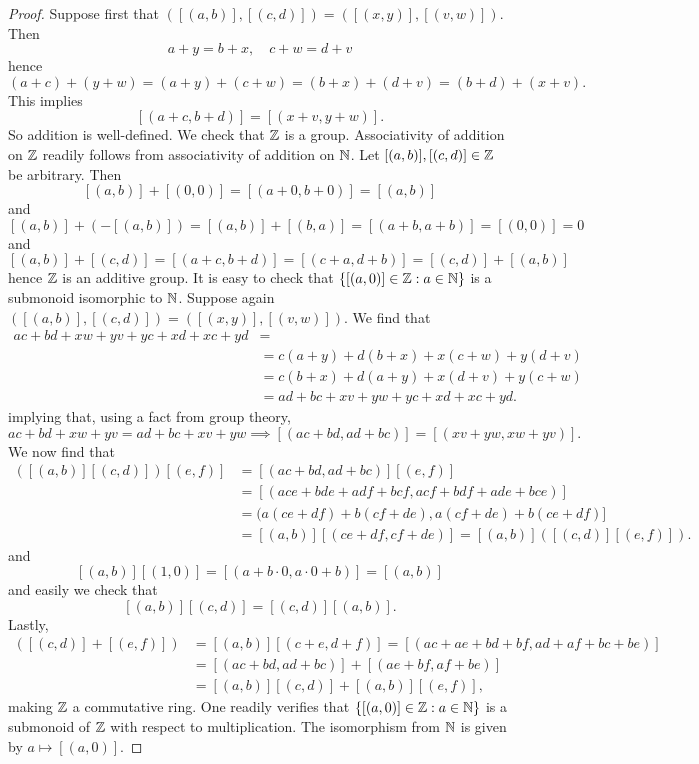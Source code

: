     \begin{proof}
        Suppose first that $([(a,b)],[(c,d)])=([(x,y)],[(v,w)])$. Then 
        $$
            a+y=b+x,\quad c+w=d+v
        $$
        hence
        $$
            (a+c)+(y+w)=(a+y)+(c+w)=(b+x)+(d+v)=(b+d)+(x+v).
        $$
        This implies 
        $$
            [(a+c,b+d)]=[(x+v,y+w)].   
        $$
        So addition is well-defined.  We check that $\mathbb{Z}$ is a group. Associativity of addition on $\mathbb{Z}$ readily follows from associativity of addition on $\mathbb{N}$. Let $[(a,b)],[(c,d)]\in\mathbb{Z}$ be arbitrary. Then 
        $$
            [(a,b)] + [(0,0)]= [(a+0,b+0)]=[(a,b)]
        $$
        and 
        $$
            [(a,b)]+(-[(a,b)])=[(a,b)]+[(b,a)]=[(a+b,a+b)] = [(0,0)]=0
        $$
        and 
        $$
            [(a,b)]+[(c,d)] = [(a+c,b+d)]=[(c+a,d+b)]=[(c,d)]+[(a,b)]
        $$
        hence $\mathbb{Z}$ is an additive group. It is easy to check that $\{[(a,0)]\in \mathbb{Z}: a\in\mathbb{N}\}$ is a submonoid isomorphic to $\mathbb{N}$. Suppose again $([(a,b)],[(c,d)])=([(x,y)],[(v,w)])$. We find that
        \begin{align*}
            ac+bd+xw+yv+yc+xd+xc+yd &=\\
            &= c(a+y)+d(b+x)+x(c+w)+y(d+v)\\
            &= c(b+x)+d(a+y)+x(d+v)+y(c+w)\\
            &= ad+bc+xv+yw+yc+xd+xc+yd.
        \end{align*}
        implying that, using a fact from group theory,
        $$ac+bd+xw+yv=ad+bc+xv+yw \implies [(ac+bd,ad+bc)]=[(xv+yw,xw+yv)].$$
        We now find that
        \begin{align*}
            ([(a,b)][(c,d)])[(e,f)] &= [(ac+bd,ad+bc)][(e,f)]\\ &=[(ace+bde+adf+bcf,acf+bdf+ade+bce)]\\
            &= (a(ce+df)+b(cf+de),a(cf+de)+b(ce+df)]\\
            &= [(a,b)][(ce+df,cf+de)] = [(a,b)]([(c,d)][(e,f)]).
        \end{align*}
        and
        $$[(a,b)][(1,0)]=[(a+b\cdot 0,a\cdot0+b)]=[(a,b)]$$
        and easily we check that
        $$[(a,b)][(c,d)]=[(c,d)][(a,b)].$$
        Lastly,
        \begin{align*}
            [(a,b)]([(c,d)]+[(e,f)]) &= [(a,b)][(c+e,d+f)]=[(ac+ae+bd+bf,ad+af+bc+be)]\\
            &= [(ac+bd,ad+bc)]+[(ae+bf,af+be)]\\
            &=[(a,b)][(c,d)]+[(a,b)][(e,f)],
        \end{align*}
        making $\mathbb{Z}$ a commutative ring.
        One readily verifies that $\{[(a,0)]\in\mathbb{Z}:a\in\mathbb{N}\}$ is a submonoid of $\mathbb{Z}$ with respect to multiplication. The isomorphism from $\mathbb{N}$ is given by $a\mapsto [(a,0)]$.
        \end{proof}
